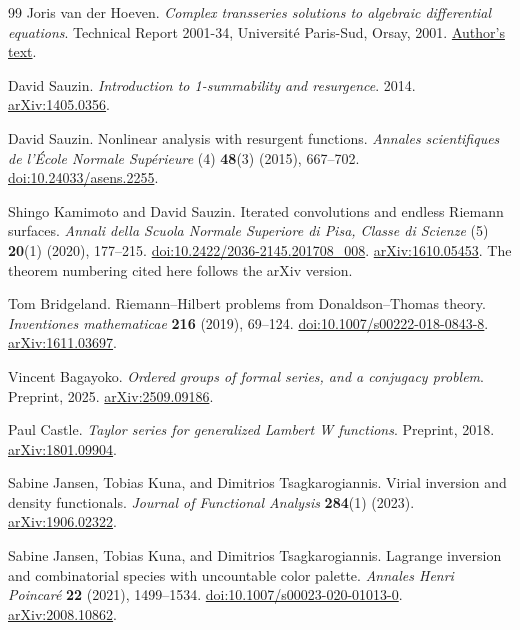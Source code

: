 \documentclass[11pt,a4paper]{article}
\numberwithin{equation}{section}
\theoremstyle{definition}
\theoremstyle{remark}
\begin{document}
\begin{thebibliography}{99}
Joris van der Hoeven.
\emph{Complex transseries solutions to algebraic differential equations}.
Technical Report 2001-34, Universit\'e Paris-Sud, Orsay, 2001.
\href{https://www.texmacs.org/joris/osc/osc.html}{Author's text}.

David Sauzin.
\emph{Introduction to 1-summability and resurgence}.
2014. \href{https://arxiv.org/abs/1405.0356}{arXiv:1405.0356}.

David Sauzin.
Nonlinear analysis with resurgent functions.
\emph{Annales scientifiques de l'\'Ecole Normale Sup\'erieure}
(4) \textbf{48}(3) (2015), 667--702.
\href{https://doi.org/10.24033/asens.2255}{doi:10.24033/asens.2255}.

Shingo Kamimoto and David Sauzin.
Iterated convolutions and endless Riemann surfaces.
\emph{Annali della Scuola Normale Superiore di Pisa,
Classe di Scienze} (5) \textbf{20}(1) (2020), 177--215.
\href{https://doi.org/10.2422/2036-2145.201708_008}
{doi:10.2422/2036-2145.201708\_008}.
\href{https://arxiv.org/abs/1610.05453}{arXiv:1610.05453}.
The theorem numbering cited here follows the arXiv version.

Tom Bridgeland.
Riemann--Hilbert problems from Donaldson--Thomas theory.
\emph{Inventiones mathematicae} \textbf{216} (2019), 69--124.
\href{https://doi.org/10.1007/s00222-018-0843-8}
{doi:10.1007/s00222-018-0843-8}.
\href{https://arxiv.org/abs/1611.03697}{arXiv:1611.03697}.

Vincent Bagayoko.
\emph{Ordered groups of formal series, and a conjugacy problem}.
Preprint, 2025.
\href{https://arxiv.org/abs/2509.09186}{arXiv:2509.09186}.

Paul Castle.
\emph{Taylor series for generalized Lambert W functions}.
Preprint, 2018.
\href{https://arxiv.org/abs/1801.09904}{arXiv:1801.09904}.

Sabine Jansen, Tobias Kuna, and Dimitrios Tsagkarogiannis.
Virial inversion and density functionals.
\emph{Journal of Functional Analysis} \textbf{284}(1) (2023).
\href{https://arxiv.org/abs/1906.02322}{arXiv:1906.02322}.

Sabine Jansen, Tobias Kuna, and Dimitrios Tsagkarogiannis.
Lagrange inversion and combinatorial species with uncountable color palette.
\emph{Annales Henri Poincar\'e} \textbf{22} (2021), 1499--1534.
\href{https://doi.org/10.1007/s00023-020-01013-0}
{doi:10.1007/s00023-020-01013-0}.
\href{https://arxiv.org/abs/2008.10862}{arXiv:2008.10862}.

\end{thebibliography}
\end{document}
